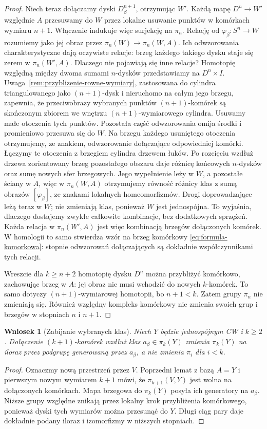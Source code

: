 \documentclass[11pt,a4paper,oneside]{report}
\theoremstyle{plain}
\newtheorem{wniosek}[twierdzenie]{Wniosek}
\theoremstyle{definition}
\theoremstyle{remark}
\begin{document}
\begin{proof}
Niech teraz dołączamy dyski $D^{n+1}_\beta$, otrzymując $W'$.
Każdą mapę $D^n\to W'$ względnie $A$ przesuwamy do $W$
przez lokalne usuwanie punktów w komórkach wymiaru $n+1$.
Włączenie indukuje więc surjekcję na $\pi_n$.
Relację od $\varphi_\beta:S^n\to W$ rozumiemy jako jej obraz
przez $\pi_n(W)\to\pi_n(W,A)$.
Ich odwzorowania charakterystyczne
dają oczywiste relacje:
brzeg każdego takiego
dysku staje się zerem
w $\pi_n(W',A)$.
Dlaczego nie pojawiają
się inne relacje?
Homotopię względną
między dwoma sumami
$n$-dysków przedstawiamy
na $D^n\times I$.
Uwaga~\ref{rem:przyblizenie-rowne-wymiary}, zastosowana do cylindra
triangulowanego jako $(n+1)$-dysk i nieruchomo na całym jego brzegu,
zapewnia, że przeciwobrazy wybranych punktów $(n+1)$-komórek
są skończonym zbiorem
we wnętrzu $(n+1)$-wymiarowego
cylindra. Usuwamy małe
otoczenia tych punktów.
Pozostała część odwzorowania
omija środki i promieniowo
przesuwa się do $W$.
Na brzegu każdego
usuniętego otoczenia
otrzymujemy, ze znakiem,
odwzorowanie dołączające
odpowiedniej komórki.
Łączymy te otoczenia z brzegiem cylindra drzewem łuków.
Po rozcięciu wzdłuż drzewa zorientowany brzeg pozostałego obszaru
daje różnicę końcowych $n$-dysków oraz sumę nowych sfer brzegowych.
Jego wypełnienie leży w $W$, a pozostałe ściany w $A$,
więc w $\pi_n(W,A)$ otrzymujemy równość różnicy klas z sumą
obrazów $[\varphi_\beta]$, ze znakami lokalnych homeomorfizmów.
Drogi doprowadzające leżą teraz w $W$; nie zmieniają klas,
ponieważ $W$ jest jednospójna. To wyjaśnia, dlaczego dostajemy
zwykłe całkowite kombinacje, bez dodatkowych sprzężeń.
Każda relacja w
$\pi_n(W',A)$
jest więc kombinacją
brzegów dołączonych
komórek.
W homologii to samo
stwierdza wzór
na brzeg komórkowy
\eqref{eq:formula-komorkowa}:
stopnie odwzorowań dołączających
są dokładnie
współczynnikami
tych relacji.

Wreszcie dla $k\geq n+2$
homotopię dysku $D^n$
można przybliżyć
komórkowo, zachowując
brzeg w $A$: jej obraz
nie musi wchodzić
do nowych $k$-komórek.
To samo dotyczy
$(n+1)$-wymiarowej
homotopii, bo $n+1<k$.
Zatem grupy $\pi_n$
nie zmieniają się.
Również względny
kompleks komórkowy
nie zmienia swoich
grup i brzegów
w stopniach $n$ i $n+1$.
\end{proof}

\begin{wniosek}[Zabijanie wybranych klas]
\label{cor:zabijanie-klas-pi}
Niech $Y$ będzie jednospójnym CW i $k\geq2$.
Dołączenie $(k+1)$-komórek wzdłuż klas $a_\beta\in\pi_k(Y)$
zmienia $\pi_k(Y)$ na iloraz przez podgrupę generowaną przez $a_\beta$,
a nie zmienia $\pi_i$ dla $i<k$.
\end{wniosek}
\begin{proof}
Oznaczmy nową przestrzeń przez $V$. Poprzedni lemat z bazą $A=Y$
i pierwszym nowym wymiarem $k+1$ mówi, że
$\pi_{k+1}(V,Y)$ jest wolna na dołączonych komórkach.
Mapa brzegowa do $\pi_k(Y)$ posyła ich generatory na $a_\beta$.
Niższe grupy względne znikają przez lokalny krok przybliżenia
komórkowego, ponieważ dyski tych wymiarów można przesunąć do $Y$.
Długi ciąg pary daje dokładnie podany iloraz i izomorfizmy w niższych stopniach.
\end{proof}
\end{document}

